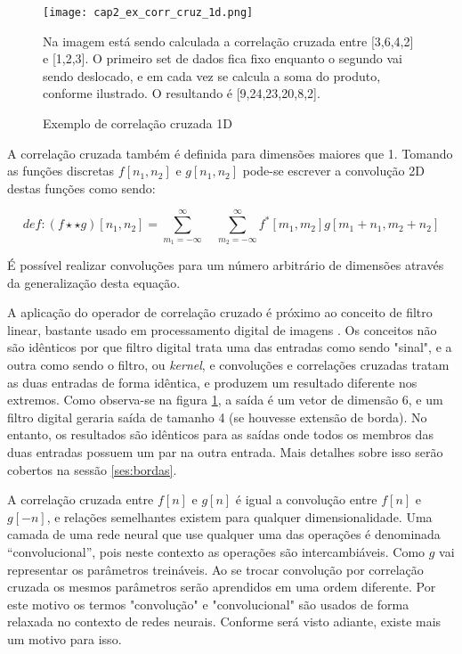 \begin{figure}[!htb]
	\centering
	\texttt{[image: cap2\_ex\_corr\_cruz\_1d.png]}
	\caption{Exemplo de correlação cruzada 1D}
	\label{fig:cap2_ex_corr_cruz_1d}
	Na imagem está sendo calculada a correlação cruzada entre [3,6,4,2] e
	[1,2,3]. O primeiro set de dados fica fixo enquanto o segundo vai sendo
	deslocado, e em cada vez se calcula a soma do produto, conforme ilustrado.
	O resultando é [9,24,23,20,8,2].
\end{figure}

A correlação cruzada também é definida para dimensões maiores que 1.
Tomando as funções discretas $f[n_1,n_2]$ e $g[n_1,n_2]$ pode-se 
escrever a convolução 2D destas funções como sendo:

\begin{equation}
	def: (f \star\star g)[n_1,n_2] =
		\sum_{m_1=-\infty}^{\infty} \quad
		\sum_{m_2=-\infty}^{\infty}
		f^*[m_1,m_2]g[m_1+n_1,m_2+n_2]
\end{equation}

É possível realizar convoluções para um número arbitrário de dimensões através
da generalização desta equação.

A aplicação do operador de correlação cruzado é próximo ao conceito de filtro
linear, bastante usado em processamento digital de imagens
\cite{gonzalezwoods200708}. Os conceitos não
são idênticos por que filtro digital trata uma das entradas como sendo "sinal",
e a outra como sendo o filtro, ou \emph{kernel}, e convoluções e correlações
cruzadas tratam as duas entradas de forma idêntica, e produzem um resultado
diferente nos extremos. Como observa-se na figura
\ref{fig:cap2_ex_corr_cruz_1d}, a saída é um vetor de dimensão 6, e um filtro
digital geraria saída de tamanho 4 (se houvesse extensão de borda).
No entanto, os resultados são idênticos para as saídas onde todos os membros
das duas entradas possuem um par na outra entrada. Mais detalhes sobre isso
serão cobertos na sessão \ref{ses:bordas}.

A correlação cruzada entre $f[n]$ e $g[n]$
é igual a convolução entre $f[n]$ e $g[-n]$, e relações semelhantes existem
para qualquer dimensionalidade. Uma camada de uma rede
neural que use qualquer uma das operações é denominada “convolucional”,
pois neste contexto as operações são intercambiáveis. Como $g$ vai
representar os parâmetros treináveis. Ao se trocar convolução por correlação
cruzada os mesmos parâmetros serão aprendidos em uma ordem diferente.
Por este motivo os termos "convolução" e "convolucional" são usados de forma
relaxada no contexto de redes neurais. Conforme será visto adiante, existe
mais um motivo para isso.

